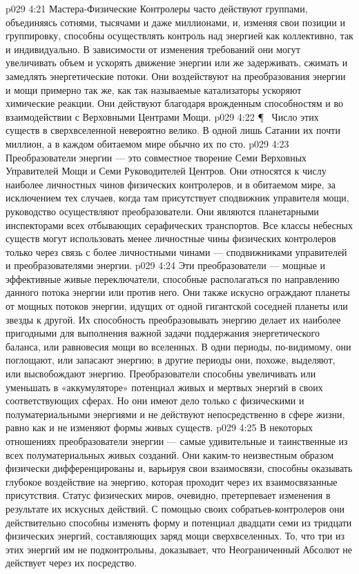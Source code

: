 \vs p029 4:21 Мастера\hyp{}Физические Контролеры часто действуют группами, объединяясь сотнями, тысячами и даже миллионами, и, изменяя свои позиции и группировку, способны осуществлять контроль над энергией как коллективно, так и индивидуально. В зависимости от изменения требований они могут увеличивать объем и ускорять движение энергии или же задерживать, сжимать и замедлять энергетические потоки. Они воздействуют на преобразования энергии и мощи примерно так же, как так называемые катализаторы ускоряют химические реакции. Они действуют благодаря врожденным способностям и во взаимодействии с Верховными Центрами Мощи.
\vs p029 4:22 \P\ \bibnobreakspace {} Число этих существ в сверхвселенной невероятно велико. В одной лишь Сатании их почти миллион, а в каждом обитаемом мире обычно их по сто.
\vs p029 4:23 Преобразователи энергии --- это совместное творение Семи Верховных Управителей Мощи и Семи Руководителей Центров. Они относятся к числу наиболее личностных чинов физических контролеров, и в обитаемом мире, за исключением тех случаев, когда там присутствует сподвижник управителя мощи, руководство осуществляют преобразователи. Они являются планетарными инспекторами всех отбывающих серафических транспортов. Все классы небесных существ могут использовать менее личностные чины физических контролеров только через связь с более личностными чинами --- сподвижниками управителей и преобразователями энергии.
\vs p029 4:24 Эти преобразователи --- мощные и эффективные живые переключатели, способные располагаться по направлению данного потока энергии или против него. Они также искусно ограждают планеты от мощных потоков энергии, идущих от одной гигантской соседней планеты или звезды к другой. Их способность преобразовывать энергию делает их наиболее пригодными для выполнения важной задачи поддержания энергетического баланса, или равновесия мощи во вселенных. В одни периоды, по\hyp{}видимому, они поглощают, или запасают энергию; в другие периоды они, похоже, выделяют, или высвобождают энергию. Преобразователи способны увеличивать или уменьшать в «аккумуляторе» потенциал живых и мертвых энергий в своих соответствующих сферах. Но они имеют дело только с физическими и полуматериальными энергиями и не действуют непосредственно в сфере жизни, равно как и не изменяют формы живых существ.
\vs p029 4:25 В некоторых отношениях преобразователи энергии --- самые удивительные и таинственные из всех полуматериальных живых созданий. Они каким\hyp{}то неизвестным образом физически дифференцированы и, варьируя свои взаимосвязи, способны оказывать глубокое воздействие на энергию, которая проходит через их взаимосвязанные присутствия. Статус физических миров, очевидно, претерпевает изменения в результате их искусных действий.  С помощью своих собратьев\hyp{}контролеров они действительно способны изменять форму и потенциал двадцати семи из тридцати физических энергий, составляющих заряд мощи сверхвселенных. То, что три из этих энергий им не подконтрольны, доказывает, что Неограниченный Абсолют не действует через их посредство.
